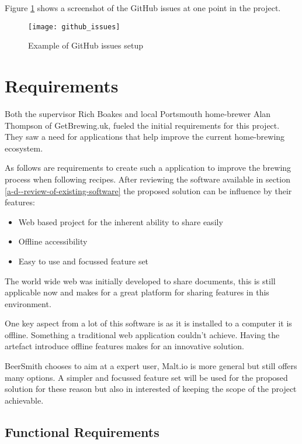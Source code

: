 Figure \ref{figure-github-issues} shows a screenshot of the GitHub issues at one point in the project.

\begin{figure}[H]
  \centering
    \texttt{[image: github\_issues]}
  \caption{Example of GitHub issues setup}
  \label{figure-github-issues}
\end{figure}

\section{Requirements} \label{a-d--requirements}

Both the supervisor Rich Boakes and local Portsmouth home-brewer Alan Thompson of GetBrewing.uk, fueled the initial requirements for this project. They saw a need for applications that help improve the current home-brewing ecosystem.

As follows are requirements to create such a application to improve the brewing process when following recipes. After reviewing the software available in section \ref{a-d--review-of-existing-software} the proposed solution can be influence by their features:

\begin{itemize}
  \item Web based project for the inherent ability to share easily
  \item Offline accessibility
  \item Easy to use and focussed feature set
\end{itemize}

The world wide web was initially developed to share documents, this is still applicable now and makes for a great platform for sharing features in this environment.

One key aspect from a lot of this software is as it is installed to a computer it is offline. Something a traditional web application couldn't achieve. Having the artefact introduce offline features makes for an innovative solution.

BeerSmith chooses to aim at a expert user, Malt.io is more general but still offers many options. A simpler and focussed feature set will be used for the proposed solution for these reason but also in interested of keeping the scope of the project achievable.

\subsection{Functional Requirements} \label{a-d--requirements--functional}

